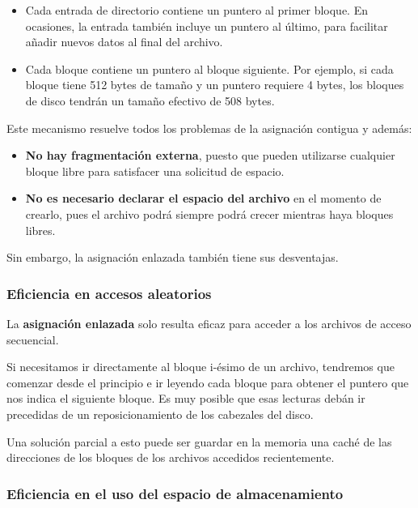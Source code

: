 \begin{itemize}
\item
  Cada entrada de directorio contiene un puntero al primer bloque. En
  ocasiones, la entrada también incluye un puntero al último, para
  facilitar añadir nuevos datos al final del archivo.
\item
  Cada bloque contiene un puntero al bloque siguiente. Por ejemplo, si
  cada bloque tiene 512 bytes de tamaño y un puntero requiere 4 bytes,
  los bloques de disco tendrán un tamaño efectivo de 508 bytes.
\end{itemize}

Este mecanismo resuelve todos los problemas de la asignación contigua y
además:

\begin{itemize}
\item
  \textbf{No hay fragmentación externa}, puesto que pueden utilizarse
  cualquier bloque libre para satisfacer una solicitud de espacio.
\item
  \textbf{No es necesario declarar el espacio del archivo} en el momento
  de crearlo, pues el archivo podrá siempre podrá crecer mientras haya
  bloques libres.
\end{itemize}

Sin embargo, la asignación enlazada también tiene sus desventajas.

\subsubsection{Eficiencia en accesos
aleatorios}\label{_eficiencia_en_accesos_aleatorios}

La \textbf{asignación enlazada} solo resulta eficaz para acceder a los
archivos de acceso secuencial.

Si necesitamos ir directamente al bloque i-ésimo de un archivo,
tendremos que comenzar desde el principio e ir leyendo cada bloque para
obtener el puntero que nos indica el siguiente bloque. Es muy posible
que esas lecturas debán ir precedidas de un reposicionamiento de los
cabezales del disco.

Una solución parcial a esto puede ser guardar en la memoria una caché de
las direcciones de los bloques de los archivos accedidos recientemente.

\subsubsection{Eficiencia en el uso del espacio de
almacenamiento}\label{_eficiencia_en_el_uso_del_espacio_de_almacenamiento}

